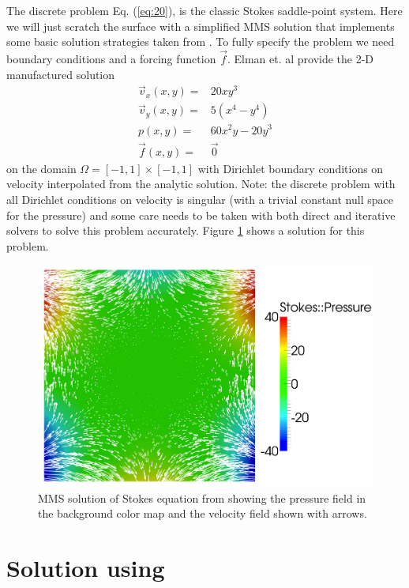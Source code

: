 The discrete problem Eq. (\ref{eq:20}),  is the classic Stokes
saddle-point system.  Here we will just scratch the
surface with a simplified MMS solution that implements some basic solution
strategies taken from \cite{elman_finite_2005}.  To fully specify the
problem we need boundary conditions and a forcing function $\vec{f}$. Elman et. al \cite{elman_finite_2005} provide  the
2-D manufactured solution 
\begin{align}
  \vec{v}_{x}(x,y) =& 20xy^{3} \nonumber \\
  \vec{v}_{y}(x,y) =& 5(x^{4} - y^{4})  \label{eq:stokes-mms}
\\
   p(x,y) =& 60x^{2}y - 20y^{3} \nonumber \\
   \vec{f}(x,y) =& \vec{0} \nonumber 
\end{align}
on the domain  $\Omega=[-1,1]\times[-1,1]$ with Dirichlet boundary conditions on velocity interpolated from the
analytic solution.  Note: the discrete problem with all Dirichlet
conditions on velocity is singular (with a trivial constant null space
for the pressure) and some care needs to be taken with both direct and
iterative solvers to solve this problem accurately. Figure
\ref{fig:stokesMMS} shows a \TF{} solution for this problem.

\begin{figure}[htbp!]
  \centering
  \includegraphics[width=.7\textwidth]{figures/stokes_flow.png}
  \caption{MMS solution of Stokes equation from
    \cite{elman_finite_2005} showing the pressure field in the background color map and the velocity field shown with arrows.}
  \label{fig:stokesMMS}
\end{figure}

\section{Solution using \TF}
\label{sec:solution-using-tf}

